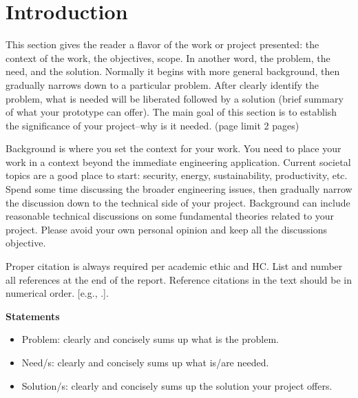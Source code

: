 \documentclass{engr1000j-s2}
\begin{document}
  \newpage
  \tableofcontents
  \thispagestyle{mystyle}
  \newpage

  \section{Introduction}
  This section gives the reader a flavor of the work or project presented: the context
  of the work, the objectives, scope. In another word, the problem, the need, and
  the solution. Normally it begins with more general background, then gradually narrows
  down to a particular problem. After clearly identify the problem, what is needed
  will be liberated followed by a solution (brief summary of what your prototype
  can offer). The main goal of this section is to establish the significance of
  your project--why is it needed. (page limit 2 pages)

  Background is where you set the context for your work. You need to place your
  work in a context beyond the immediate engineering application. Current societal
  topics are a good place to start: security, energy, sustainability, productivity,
  etc. Spend some time discussing the broader engineering issues, then gradually
  narrow the discussion down to the technical side of your project. Background can
  include reasonable technical discussions on some fundamental theories related to
  your project. Please avoid your own personal opinion and keep all the
  discussions objective.

  Proper citation is always required per academic ethic and HC. List and number all
  references at the end of the report. Reference citations in the text should be
  in numerical order. [e.g., \citep{brandis2016nonequi}.].

  \hspace{1em}
  
  \textbf{Statements}
  \begin{itemize}
    \item Problem: clearly and concisely sums up what is the problem.\\

    \item Need/s: clearly and concisely sums up what is/are needed.\\

    \item Solution/s: clearly and concisely sums up the solution your project offers.
  \end{itemize}
\end{document}
